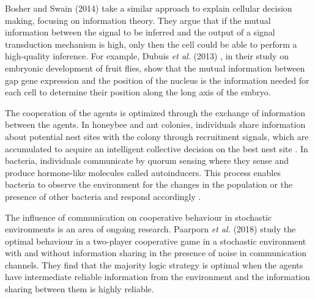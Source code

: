 Bosher and Swain (2014) \cite{Bowsher2014} take a similar approach to explain cellular decision making, focusing on information theory. They argue that if the mutual information between the signal to be inferred and the output of a signal transduction mechanism is high, only then the cell could be able to perform a high-quality inference. For example, Dubuis \textit{et al.} (2013) \cite{dubuis2013}, in their study on embryonic development of fruit flies, show that the mutual information between gap gene expression and the position of the nucleus is the information needed for each cell to determine their position along the long axis of the embryo. \par
The cooperation of the agents is optimized through the exchange of information between the agents. In honeybee and ant colonies, individuals share information about potential nest sites with the colony through recruitment signals, which are accumulated to acquire an intelligent collective decision on the best nest site \cite{Franks2002}. In bacteria, individuals communicate by quorum sensing where they sense and produce hormone-like molecules called autoinducers. This process enables bacteria to observe the environment for the changes in the population or the presence of other bacteria and respond accordingly \cite{waters2005quorum}.\par
The influence of communication on cooperative behaviour in stochastic environments is an area of ongoing research. Paarporn \textit{et al.} (2018) \cite{Paarporn2018a} study the optimal behaviour in a two-player cooperative game in a stochastic environment with and without information sharing in the presence of noise in communication channels. They find that the majority logic strategy is optimal when the agents have intermediate reliable information from the environment and the information sharing between them is highly reliable.

